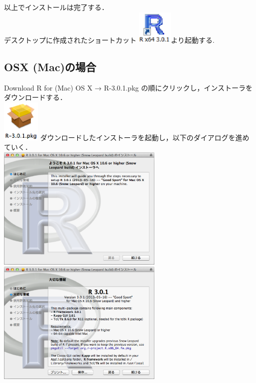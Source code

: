 \documentclass[a4paper,10pt,fleqn]{jarticle}
\begin{document}
以上でインストールは完了する．\\

デスクトップに作成されたショートカット \includegraphics[width=1.7cm]{img/windows/win012.eps}より起動する.
\subsection{OSX (Mac)の場合}
Download R for (Mac) OS X → R-3.0.1.pkg の順にクリックし，インストーラをダウンロードする．\\

\includegraphics[width=1.8cm]{img/osx/osx001.eps} ダウンロードしたインストーラを起動し，以下のダイアログを進めていく．\\

\includegraphics[width=8cm]{img/osx/osx002.eps}\hspace{0.8em} \includegraphics[width=8cm]{img/osx/osx003.eps} \\
\end{document}
